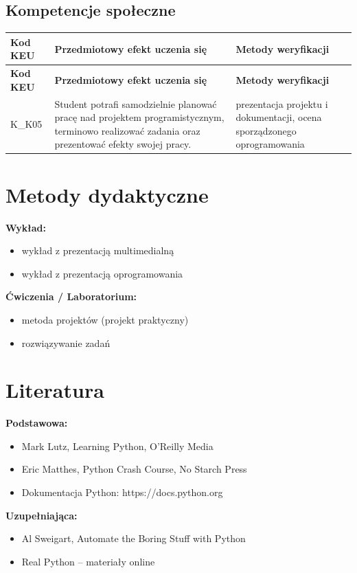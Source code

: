 \documentclass[12pt, a4paper]{article}
\newcommand{\thdrule}{\noalign{\global\setlength{\extrarowheight}{0pt}}}
\newcommand{\thdend}{\noalign{\global\setlength{\extrarowheight}{3pt}}}
\begin{document}
\subsection*{Kompetencje społeczne}
{\scriptsize
\begin{longtable}{m{1.6cm}m{9.0cm}m{4.2cm}}
\thdrule\toprule
\rowcolor{pjatkRed} {\color{white}\footnotesize\textbf{\vphantom{Ag}Kod KEU}} & {\color{white}\footnotesize\textbf{\vphantom{Ag}Przedmiotowy efekt uczenia się}} & {\color{white}\footnotesize\textbf{\vphantom{Ag}Metody weryfikacji}} \\
\midrule\thdend
\endfirsthead
\thdrule\toprule
\rowcolor{pjatkRed} {\color{white}\footnotesize\textbf{\vphantom{Ag}Kod KEU}} & {\color{white}\footnotesize\textbf{\vphantom{Ag}Przedmiotowy efekt uczenia się}} & {\color{white}\footnotesize\textbf{\vphantom{Ag}Metody weryfikacji}} \\
\midrule\thdend
\endhead
  \rowcolor{tableRowLight} K\_K05 & Student potrafi samodzielnie planować pracę nad projektem programistycznym, terminowo realizować zadania oraz prezentować efekty swojej pracy. & prezentacja projektu i dokumentacji, ocena sporządzonego oprogramowania \\
\bottomrule
\end{longtable}}

\section{Metody dydaktyczne}

\textbf{Wykład:}
\begin{itemize}
  \item wykład z prezentacją multimedialną
  \item wykład z prezentacją oprogramowania
\end{itemize}
\vspace{4pt}
\textbf{Ćwiczenia / Laboratorium:}
\begin{itemize}
  \item metoda projektów (projekt praktyczny)
  \item rozwiązywanie zadań
\end{itemize}
\vspace{4pt}


\section{Literatura}

\textbf{Podstawowa:}
\begin{itemize}
  \item Mark Lutz, Learning Python, O'Reilly Media
  \item Eric Matthes, Python Crash Course, No Starch Press
  \item Dokumentacja Python: https://docs.python.org
\end{itemize}

\textbf{Uzupełniająca:}
\begin{itemize}
  \item Al Sweigart, Automate the Boring Stuff with Python
  \item Real Python – materiały online
\end{itemize}
\end{document}
